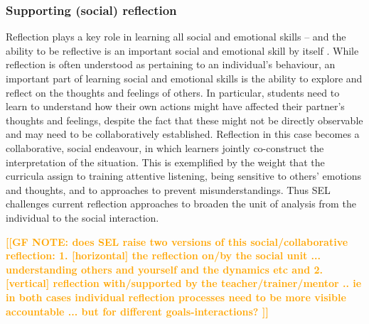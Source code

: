 \documentclass[prodmode,acmtochi]{acmsmall}
\newcommand{\Geraldine}[1]{\textrm{\textbf{\textcolor{Orange}{[[#1]]}}}}
\begin{document}

 
 

\subsubsection{Supporting (social) reflection}
\label{sec:socialReflection}


Reflection plays a key role in learning all social and emotional skills -- and the ability to be reflective is an important social and emotional skill by itself \cite{Cohen2001,Pasi2001}.  While reflection is often understood as pertaining to an individual's behaviour, an important part of learning social and emotional skills is the ability to explore and reflect on the thoughts and feelings of others. In particular, students need to learn to understand how their own actions might have affected their partner’s thoughts and feelings, despite the fact that these might not be directly observable and may need to be collaboratively established. Reflection in this case becomes a collaborative, social endeavour, in which learners jointly co-construct the interpretation of the situation.
This is exemplified by the weight that the curricula assign to training attentive listening, being sensitive to others' emotions and thoughts, and to approaches to prevent misunderstandings. Thus SEL challenges current reflection approaches to broaden the unit of analysis from the individual to the social interaction. 
%

\Geraldine{GF NOTE: does SEL raise two versions of this social/collaborative reflection: 1. [horizontal] the reflection on/by the social unit ... understanding others and yourself and the dynamics etc and 2. [vertical] reflection with/supported by the teacher/trainer/mentor .. ie in both cases individual reflection processes need to be more visible accountable ... but for different goals-interactions? }
\end{document}
